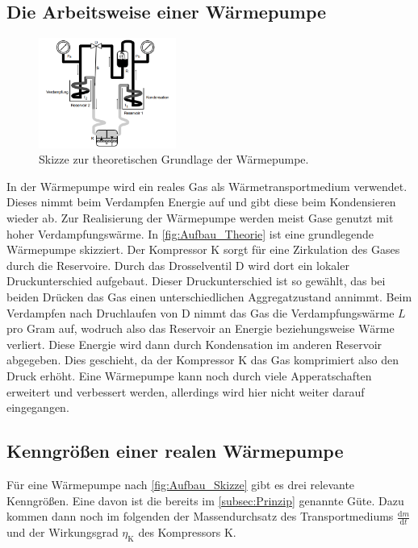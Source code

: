 \subsection{Die Arbeitsweise einer Wärmepumpe}
\label{Arbeitsweise}
\begin{figure}
    \centering
    \includegraphics[width=0.4\textwidth]{content/Ausfbau_Skizze_Theorie.png}
	\caption{Skizze zur theoretischen Grundlage der Wärmepumpe.}
	\label{fig:Aufbau_Theorie}
\end{figure}


In der Wärmepumpe wird ein reales Gas als Wärmetransportmedium verwendet. Dieses nimmt beim Verdampfen Energie auf und gibt diese beim Kondensieren wieder ab. Zur Realisierung der 
Wärmepumpe werden meist Gase genutzt mit hoher Verdampfungswärme. In \autoref{fig:Aufbau_Theorie} ist eine grundlegende Wärmepumpe skizziert. Der Kompressor K sorgt für eine Zirkulation 
des Gases durch die Reservoire. Durch das Drosselventil D wird dort ein lokaler Druckunterschied aufgebaut. Dieser Druckunterschied ist so gewählt, das bei beiden Drücken das Gas
einen unterschiedlichen Aggregatzustand annimmt. Beim Verdampfen nach Druchlaufen von D nimmt das Gas die Verdampfungswärme $L$ pro Gram auf, wodruch also das Reservoir an Energie 
beziehungsweise Wärme verliert. Diese Energie wird dann durch Kondensation im anderen Reservoir abgegeben. Dies geschieht, da der Kompressor K das Gas komprimiert also den Druck erhöht.
Eine Wärmepumpe kann noch durch viele Apperatschaften erweitert und verbessert werden, allerdings wird hier nicht weiter darauf eingegangen. 

\subsection{Kenngrößen einer realen Wärmepumpe}
\label{subsec:Kenngrößen}

Für eine Wärmepumpe nach \autoref{fig:Aufbau_Skizze} gibt es drei relevante Kenngrößen. Eine davon ist die bereits im \autoref{subsec:Prinzip} genannte Güte. Dazu kommen dann noch im
folgenden der Massendurchsatz des Transportmediums $\frac{\text{d}m}{\text{d}t}$ und der Wirkungsgrad $\eta_{\text{K}}$ des Kompressors K. 


